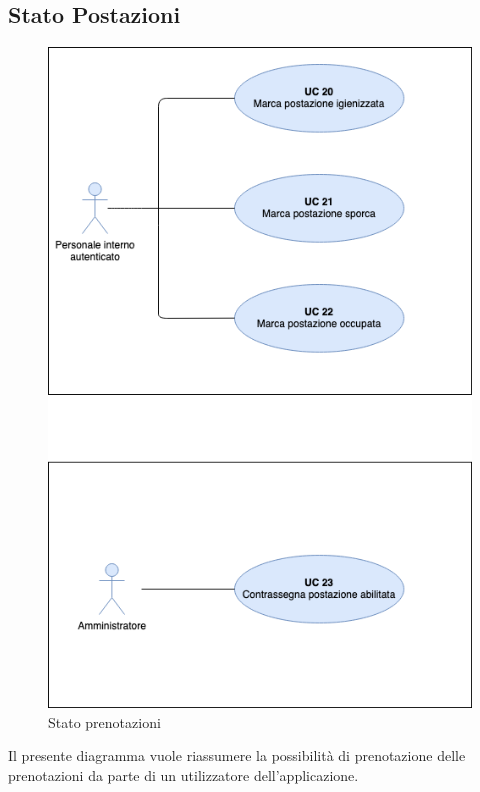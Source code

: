 \subsection{Stato Postazioni}

\begin{figure}[H]
  \centering
    \includegraphics[width=\textwidth]{src/CasiDUso/immagini/UC-statoPostazioni.png}
  \caption{Stato prenotazioni}
\end{figure}

Il presente diagramma vuole riassumere la possibilità di prenotazione delle prenotazioni da parte di un utilizzatore dell’applicazione.

